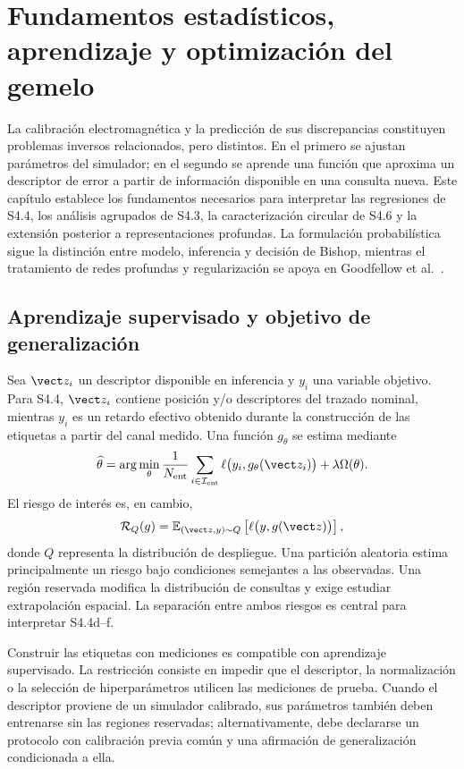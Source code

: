 \chapter{Fundamentos estadísticos, aprendizaje y optimización del gemelo}
\label{ch:learning_foundations}

La calibración electromagnética y la predicción de sus discrepancias constituyen problemas
inversos relacionados, pero distintos. En el primero se ajustan parámetros del simulador;
en el segundo se aprende una función que aproxima un descriptor de error a partir de
información disponible en una consulta nueva. Este capítulo establece los fundamentos
necesarios para interpretar las regresiones de S4.4, los análisis agrupados de S4.3, la caracterización circular de S4.6 y la
extensión posterior a representaciones profundas. La formulación probabilística sigue
la distinción entre modelo, inferencia y decisión de Bishop, mientras el tratamiento de
redes profundas y regularización se apoya en Goodfellow et al.\ \citep{Bishop2006PRML,Goodfellow2016DL}.

\section{Aprendizaje supervisado y objetivo de generalización}

Sea $\vect z_i$ un descriptor disponible en inferencia y $y_i$ una variable objetivo.
Para S4.4, $\vect z_i$ contiene posición y/o descriptores del trazado nominal, mientras
$y_i$ es un retardo efectivo obtenido durante la construcción de las etiquetas a partir
del canal medido. Una función $g_\theta$ se estima mediante
\begin{equation}
\widehat\theta=\arg\min_\theta
\frac{1}{N_{\rm ent}}\sum_{i\in\mathcal I_{\rm ent}}
\ell\bigl(y_i,g_\theta(\vect z_i)\bigr)+\lambda\Omega(\theta).
\label{eq:empirical_risk}
\end{equation}
El riesgo de interés es, en cambio,
\begin{equation}
\mathcal R_Q(g)=\mathbb E_{(\vect z,y)\sim Q}
\left[\ell\bigl(y,g(\vect z)\bigr)\right],
\end{equation}
donde $Q$ representa la distribución de despliegue. Una partición aleatoria estima
principalmente un riesgo bajo condiciones semejantes a las observadas. Una región
reservada modifica la distribución de consultas y exige estudiar extrapolación espacial.
La separación entre ambos riesgos es central para interpretar S4.4d--f.

Construir las etiquetas con mediciones es compatible con aprendizaje supervisado.
La restricción consiste en impedir que el descriptor, la normalización o la selección
de hiperparámetros utilicen las mediciones de prueba. Cuando el descriptor proviene
de un simulador calibrado, sus parámetros también deben entrenarse sin las regiones
reservadas; alternativamente, debe declararse un protocolo con calibración previa común
y una afirmación de generalización condicionada a ella.

